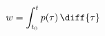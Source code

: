 \begin{multicols}{2}
\begin{CheatsheetEntryFrame}


        \begin{equation*}
            w = \int_{t_0}^{t}{p(\tau) \,\diff{\tau}}
        \end{equation*}

    \end{CheatsheetEntryFrame}

    \begin{CheatsheetEntryFrame}



\end{CheatsheetEntryFrame}
\end{multicols}
